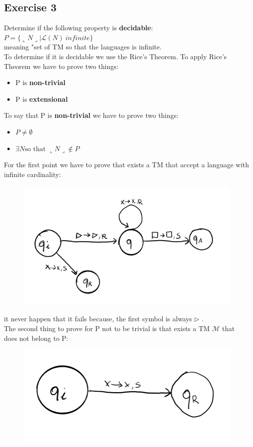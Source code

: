 \subsection{Exercise 3 }
Determine if the following property is \textbf{decidable}:\\
\(P = \{\llcorner N\lrcorner | \mathcal{L}(N) \ infinite \}\) \\
meaning "set of TM so that the languages is infinite.\\
To determine if it is decidable we use the Rice's Theorem. To apply Rice's Theorem we have to prove two things:
\begin{itemize}
	\item P is \textbf{non-trivial}
	\item P is \textbf{extensional}
\end{itemize}
To say that P is \textbf{non-trivial} we have to prove two things:
\begin{itemize}
	\item \(P \neq \emptyset\)
	\item \(\exists N \text{so that }  \llcorner N\lrcorner \notin P\)
\end{itemize}
For the first point we have to prove that exists a TM that accept a language with infinite cardinality:
\begin{figure}[H]
	\centerline{\includegraphics[scale=0.4]{figures/old/TM_always_accept}}
\end{figure}
it never happen that it fails because, the first symbol is always \(\rhd\) .\\
The second thing to prove for P not to be trivial is that exists a TM \(\mathcal{M}\) that does not belong to P:
\begin{figure}[H]
	\centerline{\includegraphics[scale=0.4]{figures/old/TM_always_reject}}
\end{figure}
